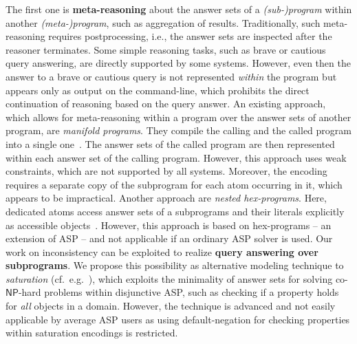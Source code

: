 \documentclass[11pt,fleqn,twoside]{article}
\newcommand\hex{{\sc hex}\xspace}
\newcommand{\conp}{co-\ensuremath{\mathsf{NP}}\xspace}
\begin{document}
		The first one is
		\textbf{meta-reasoning} about the answer sets of a \emph{(sub-)program} within another \emph{(meta-)program},
		such as aggregation of results.
		Traditionally, such meta-reasoning requires postprocessing, i.e., the answer sets are inspected after the reasoner terminates.
		Some simple reasoning tasks, such as brave or cautious query answering, are directly supported by some systems.
		However, even then the answer to a brave or cautious query is not represented \emph{within} the program but appears only as output on the command-line,
		which prohibits the direct continuation of reasoning based on the query answer.
		An existing approach, which allows for meta-reasoning within a program over the answer sets of another program, are \emph{manifold programs}.
		They compile the calling and the called program into a single one~\cite{DBLP:conf/birthday/FaberW11}.
		The answer sets of the called program are then represented within each answer set of the calling program.
		However, this approach uses weak constraints, which are not supported by all systems.
		Moreover, the encoding requires a separate copy of the subprogram for each atom occurring in it, which appears to be impractical.
		Another approach are \emph{nested \hex-programs}. Here, dedicated atoms access answer sets of a subprograms and their literals explicitly as accessible objects~\cite{ekr2013-inap11}.
		However, this approach is based on \hex-programs -- an extension of ASP -- and not applicable if an ordinary ASP solver is used.
		Our work on inconsistency can be exploited to realize \textbf{query answering over subprograms}.
		We propose this possibility as alternative modeling technique to \emph{saturation} (cf.~e.g.~), which
		exploits the minimality of answer sets for solving \conp-hard problems within disjunctive ASP, such as checking if a property holds for \emph{all} objects in a domain.
		However, the technique is advanced and not easily applicable by average ASP users
		as using default-negation for checking properties within saturation encodings is restricted.
\end{document}
